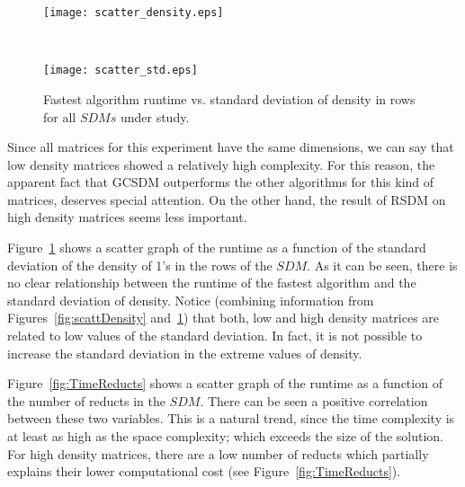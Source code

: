 \documentclass[authoryear,11pt]{elsarticle}
\begin{document}
	\begin{figure}[htb]
	\begin{minipage}{.48\textwidth}
	    \begin{center}
	       \texttt{[image: scatter\_density.eps]}
	    \end{center}
	\caption{Fastest algorithm runtime vs. density of 1's for all $SDMs$ under study.}
	\label{fig:scattDensity}
	\end{minipage}%
	~
	\begin{minipage}{.48\textwidth}
	    \begin{center}
	       \texttt{[image: scatter\_std.eps]}
	    \end{center}
	\caption{Fastest algorithm runtime vs. standard deviation of density in rows for 
			 all $SDMs$ under study.}
	\label{fig:scattStd}
	\end{minipage}	
	\end{figure}	
	
	Since all matrices for this experiment have the same dimensions, we can say that low density
	matrices showed a relatively high complexity. For this reason, the apparent fact that GCSDM outperforms 
	the other algorithms for this kind of matrices, deserves special attention. On the other hand, the result 
	of RSDM on high density matrices seems less important. 
	
	Figure~\ref{fig:scattStd} shows a scatter graph of the runtime as a function of 
	the standard deviation of the density of 1's in the rows of the $SDM$. As it can be seen, there is no
	clear relationship between the runtime of the fastest algorithm and the standard deviation of density.
	Notice (combining information from Figures~\ref{fig:scattDensity} and~\ref{fig:scattStd}) that both, 
	low and high density matrices are related to low values of the standard deviation. In fact, it is not 
	possible to increase the standard deviation in the extreme values of density.
	
	Figure~\ref{fig:TimeReducts} shows a scatter graph of the runtime as a function of the 
	number of reducts in the $SDM$. There can be seen a positive correlation between these two variables.
	This is a natural trend, since the time complexity is at least as high as the space 
	complexity; which exceeds the size of the solution. For high density matrices, there are a low number
	of reducts which partially explains their lower computational cost (see Figure~\ref{fig:TimeReducts}). 
	
\end{document}
